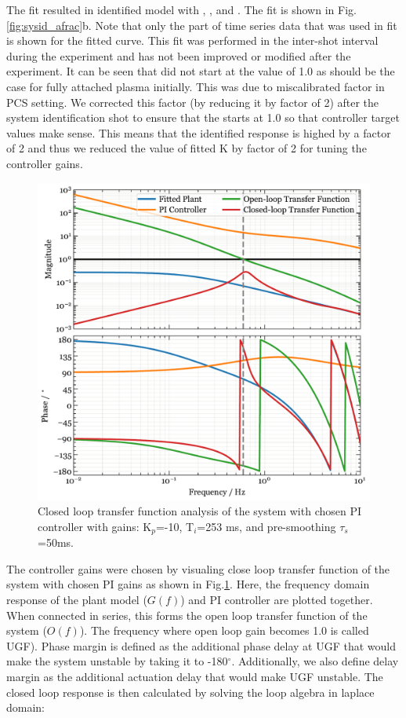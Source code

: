 The fit resulted in identified model with \AfracL, \AfracTau, and \AfracL. The fit is shown in Fig.\ref{fig:sysid_afrac}b. Note that only the part of time series data that was used in fit is shown for the fitted curve. This fit was performed in the inter-shot interval during the experiment and has not been improved or modified after the experiment. It can be seen that \Afrac did not start at the value of 1.0 as should be the case for fully attached plasma initially. This was due to miscalibrated factor in PCS setting. We corrected this factor (by reducing it by factor of 2) after the system identification shot to ensure that the \Afrac starts at 1.0 so that controller target values make sense. This means that the identified response is highed by a factor of 2 and thus we reduced the value of fitted K by factor of 2 for tuning the controller gains.

\begin{figure}[!ht]
 \centering
 \includegraphics[width=\linewidth]{figures/Afrac_LoopStability.pdf}
 \caption{Closed loop transfer function analysis of the system with chosen PI controller with gains: K$_p$=-10, T$_i$=253 ms, and pre-smoothing $\tau_s$=50ms.}
 \label{fig:cltf_afrac}
\end{figure}



The controller gains were chosen by visualing close loop transfer function of the system with chosen PI gains as shown in Fig.\ref{fig:cltf_afrac}. Here, the frequency domain response of the plant model ($G(f)$) and PI controller are plotted together. When connected in series, this forms the open loop transfer function of the system ($O(f)$). The frequency where open loop gain becomes 1.0 is called \ac{UGF}). Phase margin is defined as the additional phase delay at \ac{UGF} that would make the system unstable by taking it to -180$^\circ$. Additionally, we also define delay margin as the additional actuation delay that would make \ac{UGF} unstable. The closed loop response is then calculated by solving the loop algebra in laplace domain:

